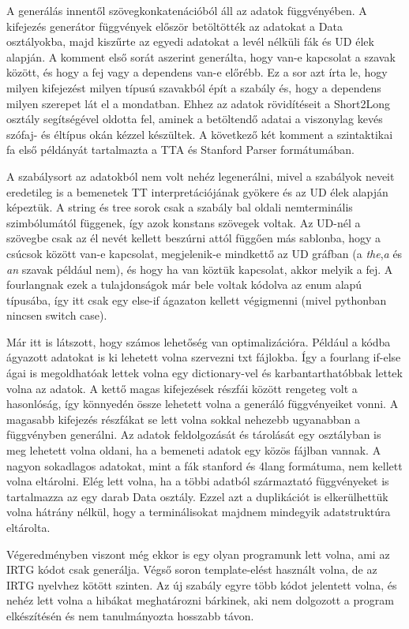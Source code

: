 A generálás innentől szövegkonkatenációból áll az adatok függvényében.
A kifejezés generátor függvények először betöltötték az adatokat a Data osztályokba, majd kiszűrte az egyedi adatokat a levél nélküli fák és UD élek alapján. A komment első sorát aszerint generálta, hogy van-e kapcsolat a szavak között, és hogy a fej vagy a dependens van-e  előrébb. Ez a sor azt írta le, hogy milyen kifejezést milyen típusú szavakból épít a szabály és, hogy a dependens milyen szerepet lát el a mondatban. Ehhez az adatok rövidítéseit a Short2Long osztály segítségével oldotta fel, aminek a betöltendő adatai  a viszonylag kevés szófaj- és éltípus okán kézzel készültek. A következő két komment a szintaktikai fa első példányát tartalmazta a TTA és Stanford Parser formátumában. 

A szabálysort az adatokból nem volt nehéz legenerálni, mivel a szabályok neveit eredetileg is a bemenetek TT interpretációjának gyökere és az UD élek alapján képeztük. A string és tree sorok csak a szabály bal oldali nemterminális szimbólumától függenek, így azok konstans szövegek voltak. Az UD-nél a szövegbe csak az él nevét kellett beszúrni attól függően más sablonba, hogy a csúcsok között van-e kapcsolat, megjelenik-e mindkettő az UD gráfban (a \textit{the},\textit{a} és \textit{an} szavak például nem), és hogy ha van köztük kapcsolat, akkor melyik a fej. A fourlangnak ezek a tulajdonságok már bele voltak kódolva az enum alapú típusába, így itt csak egy else-if ágazaton kellett végigmenni (mivel pythonban nincsen switch case).

Már itt is látszott, hogy számos lehetőség van optimalizációra. Például a kódba ágyazott adatokat is ki lehetett volna szervezni txt fájlokba. Így a fourlang if-else ágai is megoldhatóak lettek volna egy dictionary-vel és karbantarthatóbbak lettek volna az adatok. A kettő magas kifejezések részfái között rengeteg volt a hasonlóság, így könnyedén össze lehetett volna a generáló függvényeiket vonni. A magasabb kifejezés részfákat se lett volna sokkal nehezebb ugyanabban a függvényben generálni. Az adatok feldolgozását és tárolását egy osztályban is meg lehetett volna oldani, ha a bemeneti adatok egy közös fájlban vannak. A nagyon sokadlagos adatokat, mint a fák stanford és 4lang formátuma, nem kellett volna eltárolni. Elég lett volna, ha a többi adatból származtató függvényeket is tartalmazza az egy darab Data osztály. Ezzel azt a duplikációt is elkerülhettük volna hátrány nélkül, hogy a terminálisokat majdnem mindegyik adatstruktúra eltárolta.

Végeredményben viszont még ekkor is egy olyan programunk lett volna, ami az IRTG kódot csak generálja. Végső soron template-elést használt volna, de az IRTG nyelvhez kötött szinten. Az új szabály egyre több kódot jelentett volna, és nehéz lett volna a hibákat meghatározni bárkinek, aki nem dolgozott a program elkészítésén és nem tanulmányozta hosszabb távon.


